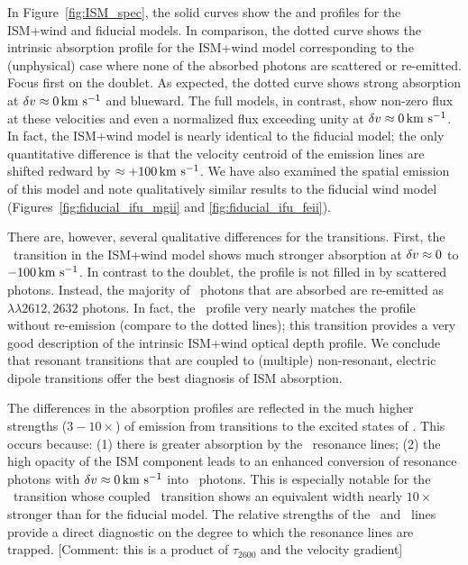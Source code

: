\documentclass[12pt,preprint]{aastex}
\begin{document}
In Figure~\ref{fig:ISM_spec}, the solid curves show the  and
 profiles for the ISM+wind and fiducial 
models. In comparison, the
dotted curve shows the intrinsic absorption profile for the ISM+wind
model corresponding to the (unphysical) case
where none of the absorbed photons are scattered or re-emitted.   Focus first on the
 doublet.  As expected, the dotted curve shows strong
absorption at $\delta v \approx 0 \, {\rm km~s^{-1}}$ and blueward.  The full models,
in contrast, show non-zero flux at these velocities and even a
normalized flux exceeding unity at $\delta v \approx 0 \, {\rm km~s^{-1}}$.  In
fact, the ISM+wind model is nearly identical to the fiducial model;
the only quantitative difference is that the velocity centroid of
the emission lines are shifted redward by $\approx +100 \, {\rm km~s^{-1}}$.
We have also examined the spatial emission of this model and note
qualitatively similar results to the fiducial wind model
(Figures~\ref{fig:fiducial_ifu_mgii} and \ref{fig:fiducial_ifu_feii}).

There are, however, several qualitative differences 
for the  transitions. 
First, the \feiia\ transition in the ISM+wind model
shows much stronger absorption at $\delta v \approx 0$
to $-100 \, {\rm km~s^{-1}}$.  In contrast to the  doublet,
the profile is not filled in by scattered photons. Instead, 
the majority of \feiia\ photons that are absorbed are re-emitted as
\feiis$\lambda\lambda 2612, 2632$ photons.  In fact, the
\feiia\ profile very nearly matches the profile without re-emission 
(compare to the dotted lines); this transition provides a
very good description of the intrinsic ISM+wind optical depth profile.  
We conclude that resonant transitions that are coupled to (multiple)
non-resonant, electric dipole transitions offer the best
diagnosis of ISM absorption.

The differences in the  absorption profiles are reflected
in the much higher strengths ($3-10\times$) of emission from
transitions to the excited states of \aconfig.   This occurs because:
(1) there is greater absorption by the \feiid\
resonance lines; (2) the high opacity of the ISM component leads to
an enhanced conversion of resonance photons with $\delta v \approx 0\, {\rm km~s^{-1}}$
into \feiis\ photons.  This is especially notable for the
\feiib\ transition whose coupled \feiis\ transition shows an equivalent width nearly
$10\times$ stronger than for the fiducial model.  The relative
strengths of the \feiib\ and \feiie\ lines provide a direct
diagnostic on the degree to which the resonance lines are trapped.
[Comment:  this is a product of $\tau_{2600}$ and the velocity
gradient]
\end{document}
